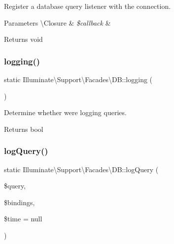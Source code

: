 Register a database query listener with the connection.


\begin{DoxyParams}[1]{Parameters}
\textbackslash{}\+Closure & {\em \$callback} & \\
\hline
\end{DoxyParams}
\begin{DoxyReturn}{Returns}
void 
\end{DoxyReturn}
\mbox{\label{class_illuminate_1_1_support_1_1_facades_1_1_d_b_a2457a232d9ccf13ded59a39345635dee}} 
\subsubsection{\texorpdfstring{logging()}{logging()}}
{\footnotesize\ttfamily static Illuminate\textbackslash{}\+Support\textbackslash{}\+Facades\textbackslash{}\+D\+B\+::logging (\begin{DoxyParamCaption}{ }\end{DoxyParamCaption})\hspace{0.3cm}{\ttfamily [static]}}

Determine whether we\textquotesingle{}re logging queries.

\begin{DoxyReturn}{Returns}
bool 
\end{DoxyReturn}
\mbox{\label{class_illuminate_1_1_support_1_1_facades_1_1_d_b_a638ffe152df52b7d57f27545b9b62696}} 
\subsubsection{\texorpdfstring{log\+Query()}{logQuery()}}
{\footnotesize\ttfamily static Illuminate\textbackslash{}\+Support\textbackslash{}\+Facades\textbackslash{}\+D\+B\+::log\+Query (\begin{DoxyParamCaption}\item[{}]{\$query,  }\item[{}]{\$bindings,  }\item[{}]{\$time = {\ttfamily null} }\end{DoxyParamCaption})\hspace{0.3cm}{\ttfamily [static]}}

